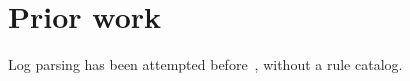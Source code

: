 \section{Prior work}

Log parsing has been attempted before~\cite{nobody2026}, without a rule catalog.
